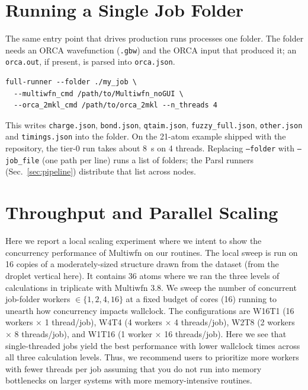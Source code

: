 
\begingroup\color{revcolor}
\section{Running a Single Job Folder}
\label{app:single_folder}

The same entry point that drives production runs processes one folder. The folder needs an
ORCA wavefunction (\texttt{.gbw}) and the ORCA input that produced it; an \texttt{orca.out},
if present, is parsed into \texttt{orca.json}.
\begin{verbatim}
full-runner --folder ./my_job \
  --multiwfn_cmd /path/to/Multiwfn_noGUI \
  --orca_2mkl_cmd /path/to/orca_2mkl --n_threads 4
\end{verbatim}
This writes \texttt{charge.json}, \texttt{bond.json}, \texttt{qtaim.json},
\texttt{fuzzy\_full.json}, \texttt{other.json} and \texttt{timings.json} into the folder.
On the 21-atom example shipped with the repository, the tier-0 run takes about 8~s on
4 threads. Replacing \texttt{--folder} with \texttt{--job\_file} (one path per line) runs
a list of folders; the Parsl runners (Sec.~\ref{sec:pipeline}) distribute that list across
nodes.
\endgroup


\section{Throughput and Parallel Scaling}
\label{app:throughput}

Here we report a local scaling experiment where we intent to show the concurrency performance
of Multiwfn on our routines. The local sweep is run on 16 copies of a moderately-sized structure drawn from
the dataset (from the droplet vertical here). It contains 36 atoms where we ran the three levels
of calculations in triplicate with Multiwfn 3.8. We sweep the number of concurrent job-folder
workers $\in \{1, 2, 4, 16\}$ at a fixed budget of cores (16) running to unearth how concurrency impacts wallclock.
The configurations are W16T1 (16 workers $\times$ 1 thread/job), W4T4 (4 workers $\times$ 4 threads/job), W2T8
(2 workers $\times$ 8 threads/job), and W1T16 (1 worker $\times$ 16 threads/job). Here we see that single-threaded
jobs yield the best performance with lower wallclock times across all three calculation levels. Thus, we
recommend users to prioritize more workers with fewer threads per job assuming that you do not run into memory bottlenecks
on larger systems with more memory-intensive routines.

